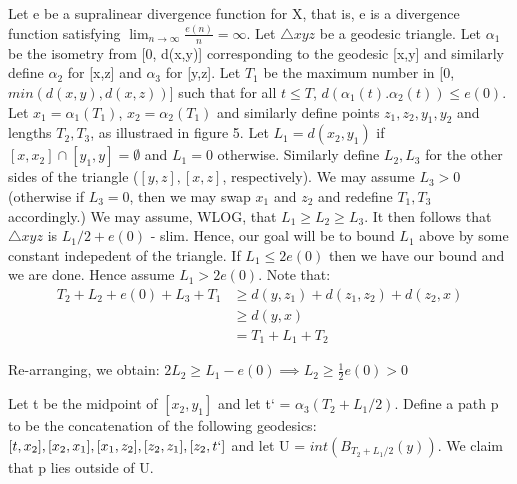 \documentclass[11pt]{article}
\newcommand{\vs}{\vskip10pt}
\begin{document}
 	Let e be a supralinear divergence function for X, that is, e is a divergence function satisfying $\lim_{n \rightarrow \infty} \frac{e(n)}{n} = \infty$. Let $\triangle xyz$ be a geodesic triangle. Let $\alpha_1$ be the isometry from [0, d(x,y)] corresponding to the geodesic [x,y] and similarly define $\alpha_2$ for [x,z] and $\alpha_3$ for [y,z]. Let $T_1$ be the maximum number in [0, $min(d(x,y), d(x, z))$] such that for all $t \leq T$, $d(\alpha_1(t). \alpha_2(t)) \leq e(0)$. Let $x_1 = \alpha_1(T_1)$, $x_2 = \alpha_2(T_1)$ and similarly define points $z_1, z_2, y_1, y_2$ and lengths $T_2, T_3$, as illustraed in figure 5. 
 	\vs
 	Let $L_1 = d(x_2, y_1)$ if $[x, x_2] \cap [y_1, y] = \emptyset$ and $L_1 = 0$ otherwise. Similarly define $L_2, L_3$ for the other sides of the triangle ($[y,z],[x,z]$, respectively). We may assume $L_3 > 0$ (otherwise if $L_3 = 0$, then we may swap $x_1$ and $z_2$ and redefine $T_1, T_3$ accordingly.)
 	\vs
 	We may assume, WLOG, that $L_1 \geq L_2 \geq L_3$. It then follows that $\triangle xyz$ is $ L_1/2 + e(0)$ - slim. Hence, our goal will be to bound $L_1$ above by some constant indepedent of the triangle. 
 	\vs
 	If $L_1 \leq 2e(0)$ then we have our bound and we are done. Hence assume $L_1 > 2e(0)$. Note that:
 	\vs
 	\begin{align*}
 	T_2 + L_2 + e(0) + L_3 + T_1 &\geq d(y, z_1) + d(z_1, z_2) + d(z_2, x) \\
    &\geq d(y, x) \\
    &= T_1 + L_1 + T_2
 	\end{align*}
 	 
 	 Re-arranging, we obtain: $2L_2 \geq L_1 - e(0) \implies L_2 \geq \frac{1}{2} e(0) > 0$
 	 \vs 
 	 
 	 Let t be the midpoint of $[x_2, y_1]$ and let t` = $\alpha_3 (T_2 + L_1/2)$. Define a path p to be the concatenation of the following geodesics: $[t, x_2], [x_2, x_1], [x_1, z_2], [z_2, z_1],[z_2, t`]$ and let U = $int(B_{T_2 + L_1/2}(y))$. We claim that p lies outside of U. 
 	 \vs
 	 
\end{document}
